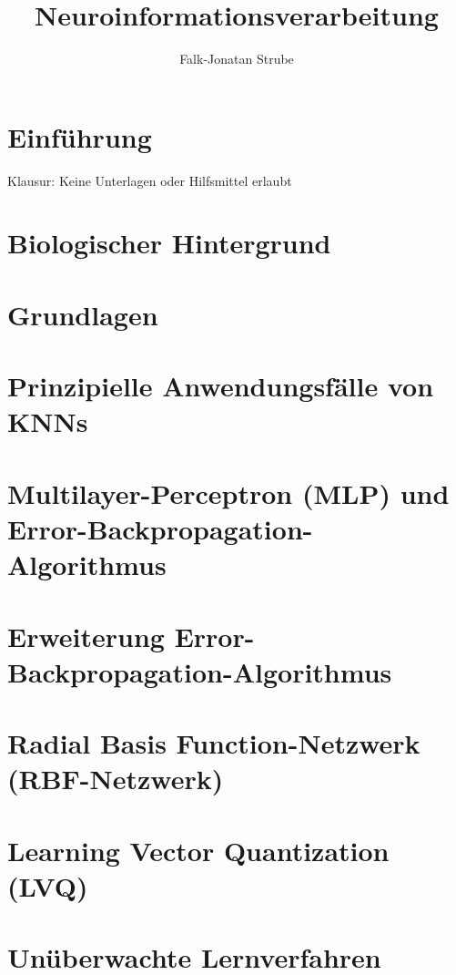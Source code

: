 \documentclass{scrreprt}
\title{Neuroinformations\-verarbeitung}
\author{Falk-Jonatan Strube}
\begin{document}
\maketitle
\tableofcontents

\chapter*{Einführung}
Klausur: Keine Unterlagen oder Hilfsmittel erlaubt

\setcounter{chapter}{-1}
\chapter{Biologischer Hintergrund}


\chapter{Grundlagen}


\chapter{Prinzipielle Anwendungsfälle von KNNs}




\chapter{Multilayer-Perceptron (MLP) und Error-Backpropagation-Algorithmus}


\chapter{Erweiterung Error-Backpropagation-Algorithmus}


\chapter{Radial Basis Function-Netzwerk (RBF-Netzwerk)}


\chapter{Learning Vector Quantization (LVQ)}


\chapter{Unüberwachte Lernverfahren}


\end{document}
